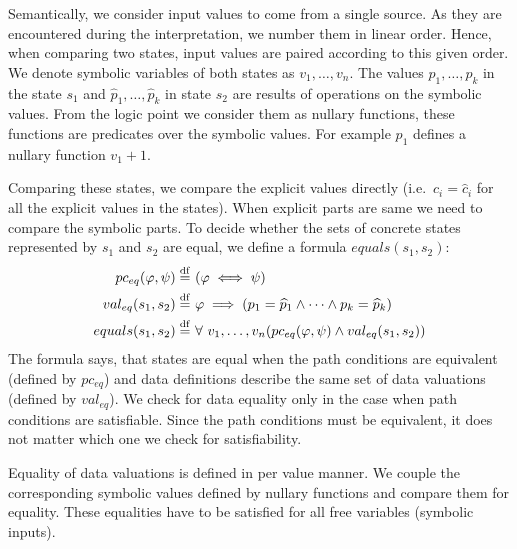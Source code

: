 Semantically, we consider input values to come from a single source. As they are
encountered during the interpretation, we number them in linear order. Hence,
when comparing two states, input values are paired according to this
given order. We denote symbolic variables of both states as $v_1, \dots, v_n$.
The values $p_1, \dots, p_k$ in the state $s_1$ and $\widehat{p}_1, \dots,
\widehat{p}_k$ in state $s_2$ are results of operations on the symbolic values.
From the logic point we consider them as nullary functions, these functions are
predicates over the symbolic values. For example $p_1$ defines a nullary
function $v_1 + 1$.

Comparing these states, we compare the explicit values directly (i.e.~$c_i =
\widehat{c}_i$ for all the explicit values in the states).  When explicit parts
are same we need to compare the symbolic parts. To decide whether the sets of
concrete states represented by $s_1$ and $s_2$ are equal, we define a formula
$equals(s_1, s_2)$:
\begin{equation*}
\begin{aligned}
    pc_{eq}(\varphi, \psi) \stackrel{\mathrm{df}}{=} & ~(\varphi \iff \psi) \\
    val_{eq}(s_1, s_2) \stackrel{\mathrm{df}}{=} & ~\varphi \implies (p_1 = \widehat{p}_1 \wedge \dots \wedge p_k = \widehat{p}_k ) \\
    equals(s_1, s_2) \stackrel{\mathrm{df}}{=} & ~\forall~v_1,\dots, v_n (pc_{eq}(\varphi, \psi)
    \wedge val_{eq}(s_1, s_2))
\end{aligned}
\end{equation*}
The formula says, that states are equal when the path conditions are
equivalent (defined by $pc_{eq}$) and data definitions describe the same set
of data valuations (defined by $val_{eq}$). We check for data equality only in
the case when path conditions are satisfiable. Since the path conditions must
be equivalent, it does not matter which one we check for satisfiability.

Equality of data valuations is defined in per value manner. We couple the
corresponding symbolic values defined by nullary functions and compare them for
equality. These equalities have to be satisfied for all free variables (symbolic
inputs).

